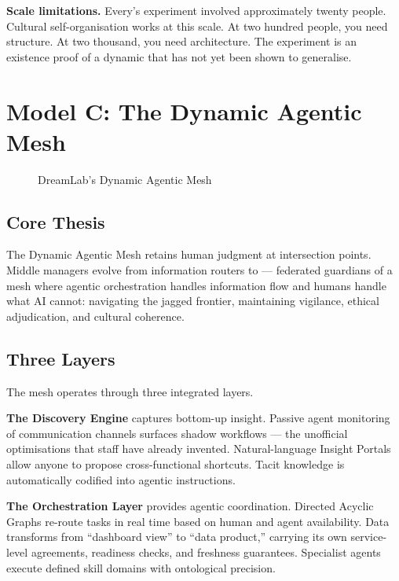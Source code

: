 \textbf{Scale limitations.} Every's experiment involved approximately twenty people. Cultural self-organisation works at this scale. At two hundred people, you need structure. At two thousand, you need architecture. The experiment is an existence proof of a dynamic that has not yet been shown to generalise.

\section{Model C: The Dynamic Agentic Mesh}

\begin{figure}[h]
\centering
{}
\caption{DreamLab's Dynamic Agentic Mesh}
\label{fig:agentic-mesh}
\end{figure}

\subsection{Core Thesis}

The Dynamic Agentic Mesh retains human judgment at intersection points. Middle managers evolve from information routers to  --- federated guardians of a mesh where agentic orchestration handles information flow and humans handle what AI cannot: navigating the jagged frontier, maintaining vigilance, ethical adjudication, and cultural coherence.

\subsection{Three Layers}

The mesh operates through three integrated layers.

\textbf{The Discovery Engine} captures bottom-up insight. Passive agent monitoring of communication channels surfaces shadow workflows --- the unofficial optimisations that staff have already invented. Natural-language Insight Portals allow anyone to propose cross-functional shortcuts. Tacit knowledge is automatically codified into agentic instructions.

\textbf{The Orchestration Layer} provides agentic coordination. Directed Acyclic Graphs re-route tasks in real time based on human and agent availability. Data transforms from ``dashboard view'' to ``data product,'' carrying its own service-level agreements, readiness checks, and freshness guarantees. Specialist agents execute defined skill domains with ontological precision.

